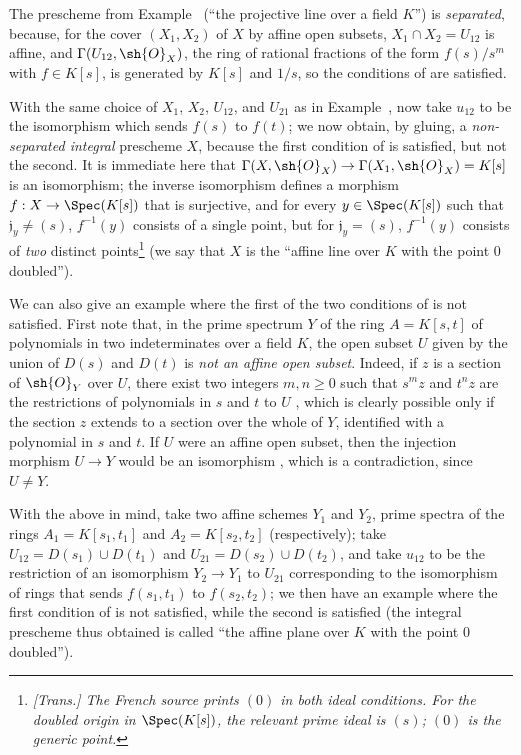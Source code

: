 \begin{examples}[5.5.11]
\label{I.5.5.11}
The prescheme from Example~ (``the projective line over a field $K$'') is \emph{separated}, because, for the cover $(X_1,X_2)$ of $X$ by affine open subsets, $X_1\cap X_2=U_{12}$ is affine, and $\Gamma(U_{12},\sh{O}_X)$, the ring of rational fractions of the form $f(s)/s^m$ with $f\in K[s]$, is generated by $K[s]$ and $1/s$, so the conditions of  are satisfied.

With the same choice of $X_1$, $X_2$, $U_{12}$, and $U_{21}$ as in Example~, now take $u_{12}$ to be the isomorphism which sends $f(s)$ to $f(t)$;
we now obtain, by gluing, a \emph{non-separated integral} prescheme $X$, because the first condition of  is satisfied, but not the second.
It is immediate here that $\Gamma(X,\sh{O}_X)\to\Gamma(X_1,\sh{O}_X)=K[s]$ is an isomorphism;
the inverse isomorphism defines a morphism $f:X\to\Spec(K[s])$ that is surjective, and for every $y\in\Spec(K[s])$ such that $\mathfrak{j}_y\neq(s)$, $f^{-1}(y)$ consists of a single point, but for $\mathfrak{j}_y=(s)$, $f^{-1}(y)$ consists of \emph{two} distinct points\footnote{\emph{[Trans.] The French source prints $(0)$ in both ideal conditions. For the doubled origin in $\Spec(K[s])$, the relevant prime ideal is $(s)$; $(0)$ is the generic point.}} (we say that $X$ is the ``affine line over $K$ with the point $0$ doubled'').

We can also give an example where the first of the two conditions of  is not satisfied.
First note that, in the prime spectrum $Y$ of the ring $A=K[s,t]$ of polynomials in two indeterminates over a field $K$, the open subset $U$ given by the union of $D(s)$ and $D(t)$ is \emph{not an affine open subset}.
Indeed, if $z$ is a section of $\sh{O}_Y$ over $U$, there exist two integers $m,n\geq0$ such that $s^mz$ and $t^nz$ are the restrictions of polynomials in $s$ and $t$ to $U$ , which is clearly possible only if the section $z$ extends to a section over the whole of $Y$, identified with a polynomial in $s$ and $t$.
If $U$ were an affine open subset, then the injection morphism $U\to Y$ would be an isomorphism , which is a contradiction, since $U\neq Y$.

With the above in mind, take two affine schemes $Y_1$ and $Y_2$, prime spectra of the rings $A_1=K[s_1,t_1]$ and $A_2=K[s_2,t_2]$ (respectively);
take $U_{12}=D(s_1)\cup D(t_1)$ and $U_{21}=D(s_2)\cup D(t_2)$, and take $u_{12}$ to be the restriction of an isomorphism $Y_2\to Y_1$ to $U_{21}$ corresponding to the isomorphism of rings that sends $f(s_1,t_1)$ to $f(s_2,t_2)$;
we then have an example where the first condition of  is not satisfied, while the second is satisfied (the integral prescheme thus obtained is called ``the affine plane over $K$ with the point $0$ doubled'').
\end{examples}

